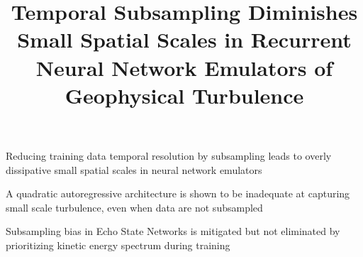 \documentclass[draft]{agujournal2019}
\begin{document}
\title{Temporal Subsampling Diminishes Small Spatial Scales in
    Recurrent Neural Network Emulators of
    Geophysical Turbulence}

%
%




\begin{keypoints}
    \item Reducing training data temporal resolution by subsampling leads to
        overly dissipative small spatial scales in neural network
        emulators
    \item A quadratic autoregressive architecture is shown to be inadequate at capturing
        small scale turbulence, even when data are not subsampled
    \item Subsampling bias in Echo State Networks is mitigated but not
        eliminated by prioritizing kinetic energy spectrum during training
\end{keypoints}

%
%
\end{document}
